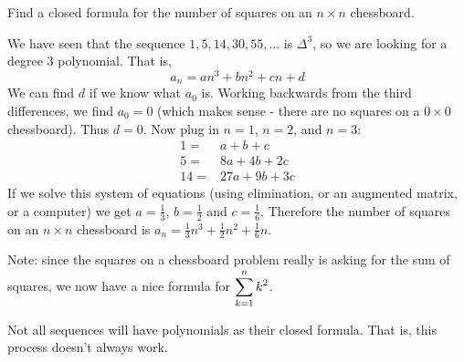 \documentclass[12pt]{article}
\begin{document}
\begin{example}
  Find a closed formula for the number of squares on an $n \times n$ chessboard.
  \begin{solution}
    We have seen that the sequence $1, 5, 14, 30, 55, \ldots$ is $\Delta^3$, so we are looking for a degree 3 polynomial.  That is, 
    \[a_n = an^3 + bn^2 + cn + d\]
    We can find $d$ if we know what $a_0$ is.  Working backwards from the third differences, we find $a_0 = 0$ (which makes sense - there are no squares on a $0\times 0$ chessboard).  Thus $d = 0$.  Now plug in $n = 1$, $n =2$, and $n =3$:
    \begin{align*}
      1 = & a + b + c \\
      5 = & 8a + 4b + 2c \\
      14 = & 27a + 9b + 3c
    \end{align*}
    If we solve this system of equations (using elimination, or an augmented matrix, or a computer) we get $a = \frac{1}{3}$, $b = \frac{1}{2}$ and $c = \frac{1}{6}$.  Therefore the number of squares on an $n \times n$ chessboard is $a_n = \frac{1}{3}n^3 + \frac{1}{2}n^2 + \frac{1}{6}n$.
  \end{solution}
  Note: since the squares on a chessboard problem really is asking for the sum of squares, we now have a nice formula for $\displaystyle\sum_{k=1}^n k^2$.
\end{example}

Not all sequences will have polynomials as their closed formula.  That is, this process doesn't always work.
\end{document}
